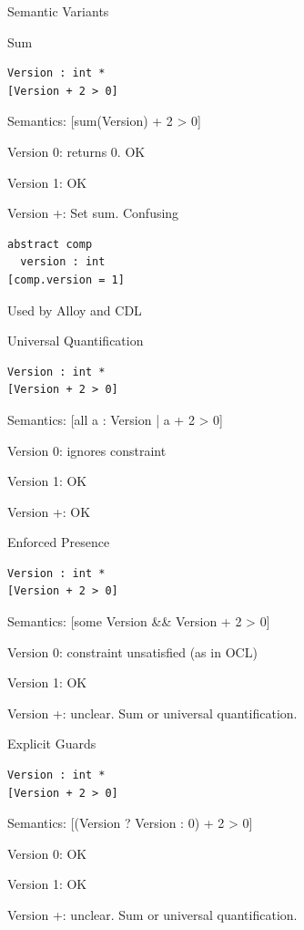 \documentclass[table,15pt,t]{beamer}
\newcommand{\vmiddle}[1]{
  \vspace{\stretch{1}}
  #1
  \vspace{\stretch{1}}
}
\newcommand{\interframe}[1]{
\begin{frame}{}
\vmiddle{\hmiddle{\Huge #1}}
\end{frame}
}
\newcommand{\hmiddle}[1]{
  \begin{center}#1\end{center}
}
\begin{document}
\interframe{Semantic Variants}

\begin{frame}[fragile,c]{Sum}
\begin{lstlisting}
Version : int *
[Version + 2 > 0]
\end{lstlisting}
\begin{list}{}{}
    \item Semantics: [sum(Version) + 2 > 0]\pause
    \item Version 0: returns 0. OK
    \item Version 1: OK
    \item Version +: Set sum. Confusing
\end{list}\pause
\begin{lstlisting}
abstract comp
  version : int
[comp.version = 1]
\end{lstlisting}\pause
Used by Alloy and CDL
\end{frame}

\begin{frame}[fragile,c]{Universal Quantification}
\begin{lstlisting}
Version : int *
[Version + 2 > 0]
\end{lstlisting}
\begin{list}{}{}
    \item Semantics: [all a : Version | a + 2 > 0]\pause
    \item Version 0: ignores constraint
    \item Version 1: OK
    \item Version +: OK
\end{list}
\end{frame}

\begin{frame}[fragile,c]{Enforced Presence}
\begin{lstlisting}
Version : int *
[Version + 2 > 0]
\end{lstlisting}
\begin{list}{}{}
    \item Semantics: [some Version \&\& Version + 2 > 0]\pause
    \item Version 0: constraint unsatisfied (as in OCL)
    \item Version 1: OK
    \item Version +: unclear. Sum or universal quantification.
\end{list}
\end{frame}

\begin{frame}[fragile,c]{Explicit Guards}
\begin{lstlisting}
Version : int *
[Version + 2 > 0]
\end{lstlisting}
\begin{list}{}{}
    \item Semantics: [(Version ? Version : 0) + 2 > 0]\pause
    \item Version 0: OK
    \item Version 1: OK
    \item Version +: unclear. Sum or universal quantification.
\end{list}
\end{frame}
\end{document}
